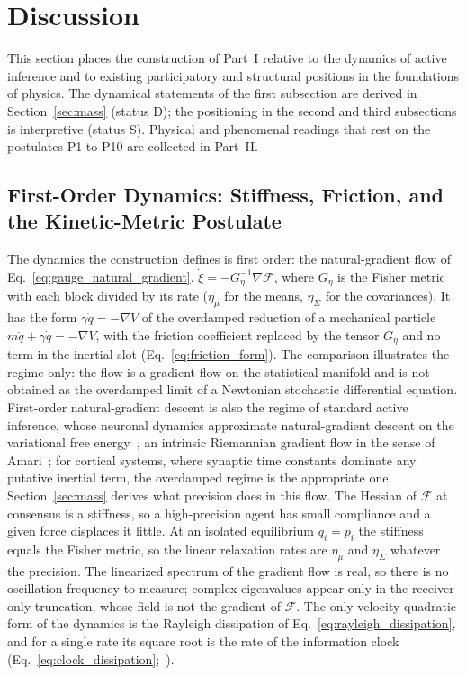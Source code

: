 \section{Discussion}\label{sec:discussion}

This section places the construction of Part~I relative to the dynamics of active inference and to existing participatory and structural positions in the foundations of physics. The dynamical statements of the first subsection are derived in Section~\ref{sec:mass} (status D); the positioning in the second and third subsections is interpretive (status S). Physical and phenomenal readings that rest on the postulates P1 to P10 are collected in Part~II.

\subsection{First-Order Dynamics: Stiffness, Friction, and the Kinetic-Metric Postulate}

The dynamics the construction defines is first order: the natural-gradient flow of Eq.~\eqref{eq:gauge_natural_gradient}, $\dot\xi = -G_\eta^{-1}\nabla\mathcal{F}$, where $G_\eta$ is the Fisher metric with each block divided by its rate ($\eta_\mu$ for the means, $\eta_\Sigma$ for the covariances). It has the form $\gamma\dot q = -\nabla V$ of the overdamped reduction of a mechanical particle $m\ddot q + \gamma\dot q = -\nabla V$, with the friction coefficient replaced by the tensor $G_\eta$ and no term in the inertial slot (Eq.~\eqref{eq:friction_form}). The comparison illustrates the regime only: the flow is a gradient flow on the statistical manifold and is not obtained as the overdamped limit of a Newtonian stochastic differential equation. First-order natural-gradient descent is also the regime of standard active inference, whose neuronal dynamics approximate natural-gradient descent on the variational free energy~\cite{DaCosta2021neural}, an intrinsic Riemannian gradient flow in the sense of Amari~\cite{Amari1998}; for cortical systems, where synaptic time constants dominate any putative inertial term, the overdamped regime is the appropriate one. Section~\ref{sec:mass} derives what precision does in this flow. The Hessian of $\mathcal{F}$ at consensus is a stiffness, so a high-precision agent has small compliance and a given force displaces it little. At an isolated equilibrium $q_i = p_i$ the stiffness equals the Fisher metric, so the linear relaxation rates are $\eta_\mu$ and $\eta_\Sigma$ whatever the precision. The linearized spectrum of the gradient flow is real, so there is no oscillation frequency to measure; complex eigenvalues appear only in the receiver-only truncation, whose field is not the gradient of $\mathcal{F}$. The only velocity-quadratic form of the dynamics is the Rayleigh dissipation of Eq.~\eqref{eq:rayleigh_dissipation}, and for a single rate its square root is the rate of the information clock (Eq.~\eqref{eq:clock_dissipation};~\cite[Ch.~7]{DennisGaugeVFE2026}).

